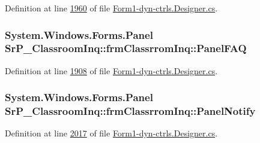 \-Definition at line \hyperlink{_form1-dyn-ctrls_8_designer_8cs_source_l01960}{1960} of file \hyperlink{_form1-dyn-ctrls_8_designer_8cs_source}{\-Form1-\/dyn-\/ctrls.\-Designer.\-cs}.

\hypertarget{class_sr_p___classroom_inq_1_1frm_classrrom_inq_ae18ea5d89fce8227797626585e3e2a1a}{
\subsubsection[{\-Panel\-F\-A\-Q}]{\setlength{\rightskip}{0pt plus 5cm}\-System.\-Windows.\-Forms.\-Panel {\bf \-Sr\-P\-\_\-\-Classroom\-Inq\-::frm\-Classrrom\-Inq\-::\-Panel\-F\-A\-Q}}}
\label{class_sr_p___classroom_inq_1_1frm_classrrom_inq_ae18ea5d89fce8227797626585e3e2a1a}


\-Definition at line \hyperlink{_form1-dyn-ctrls_8_designer_8cs_source_l01908}{1908} of file \hyperlink{_form1-dyn-ctrls_8_designer_8cs_source}{\-Form1-\/dyn-\/ctrls.\-Designer.\-cs}.

\hypertarget{class_sr_p___classroom_inq_1_1frm_classrrom_inq_a67eefeb9b6da8583b3ed3d95a3b411d0}{
\subsubsection[{\-Panel\-Notify}]{\setlength{\rightskip}{0pt plus 5cm}\-System.\-Windows.\-Forms.\-Panel {\bf \-Sr\-P\-\_\-\-Classroom\-Inq\-::frm\-Classrrom\-Inq\-::\-Panel\-Notify}}}
\label{class_sr_p___classroom_inq_1_1frm_classrrom_inq_a67eefeb9b6da8583b3ed3d95a3b411d0}


\-Definition at line \hyperlink{_form1-dyn-ctrls_8_designer_8cs_source_l02017}{2017} of file \hyperlink{_form1-dyn-ctrls_8_designer_8cs_source}{\-Form1-\/dyn-\/ctrls.\-Designer.\-cs}.

